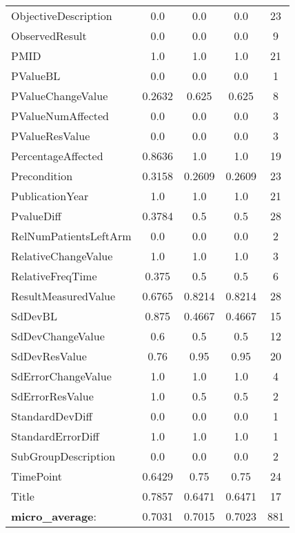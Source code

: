 \begin{longtable}{ l c c c c}
ObjectiveDescription & 0.0 & 0.0 & 0.0 & 23\\
ObservedResult & 0.0 & 0.0 & 0.0 & 9\\
PMID & 1.0 & 1.0 & 1.0 & 21\\
PValueBL & 0.0 & 0.0 & 0.0 & 1\\
PValueChangeValue & 0.2632 & 0.625 & 0.625 & 8\\
PValueNumAffected & 0.0 & 0.0 & 0.0 & 3\\
PValueResValue & 0.0 & 0.0 & 0.0 & 3\\
PercentageAffected & 0.8636 & 1.0 & 1.0 & 19\\
Precondition & 0.3158 & 0.2609 & 0.2609 & 23\\
PublicationYear & 1.0 & 1.0 & 1.0 & 21\\
PvalueDiff & 0.3784 & 0.5 & 0.5 & 28\\
RelNumPatientsLeftArm & 0.0 & 0.0 & 0.0 & 2\\
RelativeChangeValue & 1.0 & 1.0 & 1.0 & 3\\
RelativeFreqTime & 0.375 & 0.5 & 0.5 & 6\\
ResultMeasuredValue & 0.6765 & 0.8214 & 0.8214 & 28\\
SdDevBL & 0.875 & 0.4667 & 0.4667 & 15\\
SdDevChangeValue & 0.6 & 0.5 & 0.5 & 12\\
SdDevResValue & 0.76 & 0.95 & 0.95 & 20\\
SdErrorChangeValue & 1.0 & 1.0 & 1.0 & 4\\
SdErrorResValue & 1.0 & 0.5 & 0.5 & 2\\
StandardDevDiff & 0.0 & 0.0 & 0.0 & 1\\
StandardErrorDiff & 1.0 & 1.0 & 1.0 & 1\\
SubGroupDescription & 0.0 & 0.0 & 0.0 & 2\\
TimePoint & 0.6429 & 0.75 & 0.75 & 24\\
Title & 0.7857 & 0.6471 & 0.6471 & 17\\
\textbf{micro\_average}: & 0.7031 & 0.7015 & 0.7023 & 881 
\label{tab:Glaucoma_eventextr}
\end{longtable}
